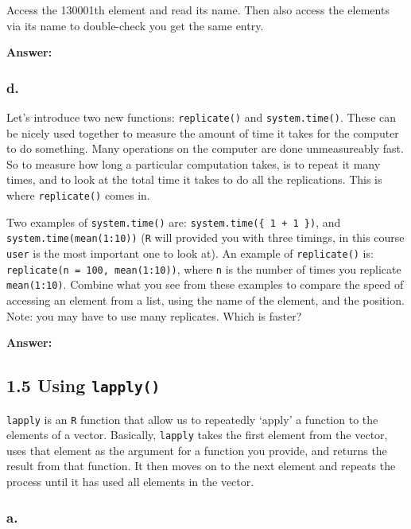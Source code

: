 \documentclass[]{article}
\begin{document}
Access the 130001th element and read its name. Then also access the
elements via its name to double-check you get the same entry.

\textbf{Answer:}

\hypertarget{d.-2}{%
\subsubsection{d.}\label{d.-2}}

Let's introduce two new functions: \texttt{replicate()} and
\texttt{system.time()}. These can be nicely used together to measure the
amount of time it takes for the computer to do something. Many
operations on the computer are done unmeasureably fast. So to measure
how long a particular computation takes, is to repeat it many times, and
to look at the total time it takes to do all the replications. This is
where \texttt{replicate()} comes in.

Two examples of \texttt{system.time()} are:
\texttt{system.time(\{\ 1\ +\ 1\ \})}, and
\texttt{system.time(mean(1:10))} (\texttt{R} will provided you with
three timings, in this course \texttt{user} is the most important one to
look at). An example of \texttt{replicate()} is:
\texttt{replicate(n\ =\ 100,\ mean(1:10))}, where \texttt{n} is the
number of times you replicate \texttt{mean(1:10)}. Combine what you see
from these examples to compare the speed of accessing an element from a
list, using the name of the element, and the position. Note: you may
have to use many replicates. Which is faster?

\textbf{Answer:}

\hypertarget{using-lapply}{%
\subsection{\texorpdfstring{1.5 Using
\texttt{lapply()}}{1.5 Using lapply()}}\label{using-lapply}}

\texttt{lapply} is an \texttt{R} function that allow us to repeatedly
`apply' a function to the elements of a vector. Basically,
\texttt{lapply} takes the first element from the vector, uses that
element as the argument for a function you provide, and returns the
result from that function. It then moves on to the next element and
repeats the process until it has used all elements in the vector.

\hypertarget{a.-3}{%
\subsubsection{a.}\label{a.-3}}
\end{document}
